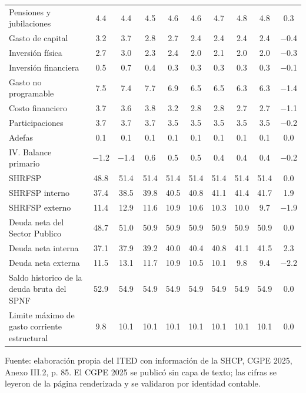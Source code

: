 \begin{longtable}{L{3.7cm}ccccccccc}
{Pensiones y jubilaciones} & \num{4.4} & \num{4.4} & \num{4.5} & \num{4.6} & \num{4.6} & \num{4.7} & \num{4.8} & \num{4.8} & \num{0.3} \\
{Gasto de capital} & \num{3.2} & \num{3.7} & \num{2.8} & \num{2.7} & \num{2.4} & \num{2.4} & \num{2.4} & \num{2.4} & \num{-0.4} \\
{Inversión física} & \num{2.7} & \num{3.0} & \num{2.3} & \num{2.4} & \num{2.0} & \num{2.1} & \num{2.0} & \num{2.0} & \num{-0.3} \\
{Inversión financiera} & \num{0.5} & \num{0.7} & \num{0.4} & \num{0.3} & \num{0.3} & \num{0.3} & \num{0.3} & \num{0.3} & \num{-0.1} \\
{Gasto no programable} & \num{7.5} & \num{7.4} & \num{7.7} & \num{6.9} & \num{6.5} & \num{6.5} & \num{6.3} & \num{6.3} & \num{-1.4} \\
{Costo financiero} & \num{3.7} & \num{3.6} & \num{3.8} & \num{3.2} & \num{2.8} & \num{2.8} & \num{2.7} & \num{2.7} & \num{-1.1} \\
{Participaciones} & \num{3.7} & \num{3.7} & \num{3.7} & \num{3.5} & \num{3.5} & \num{3.5} & \num{3.5} & \num{3.5} & \num{-0.2} \\
{Adefas} & \num{0.1} & \num{0.1} & \num{0.1} & \num{0.1} & \num{0.1} & \num{0.1} & \num{0.1} & \num{0.1} & \num{0.0} \\
{IV. Balance primario} & \num{-1.2} & \num{-1.4} & \num{0.6} & \num{0.5} & \num{0.5} & \num{0.4} & \num{0.4} & \num{0.4} & \num{-0.2} \\
{SHRFSP} & \num{48.8} & \num{51.4} & \num{51.4} & \num{51.4} & \num{51.4} & \num{51.4} & \num{51.4} & \num{51.4} & \num{0.0} \\
{SHRFSP interno} & \num{37.4} & \num{38.5} & \num{39.8} & \num{40.5} & \num{40.8} & \num{41.1} & \num{41.4} & \num{41.7} & \num{1.9} \\
{SHRFSP externo} & \num{11.4} & \num{12.9} & \num{11.6} & \num{10.9} & \num{10.6} & \num{10.3} & \num{10.0} & \num{9.7} & \num{-1.9} \\
{Deuda neta del Sector Publico} & \num{48.7} & \num{51.0} & \num{50.9} & \num{50.9} & \num{50.9} & \num{50.9} & \num{50.9} & \num{50.9} & \num{0.0} \\
{Deuda neta interna} & \num{37.1} & \num{37.9} & \num{39.2} & \num{40.0} & \num{40.4} & \num{40.8} & \num{41.1} & \num{41.5} & \num{2.3} \\
{Deuda neta externa} & \num{11.5} & \num{13.1} & \num{11.7} & \num{10.9} & \num{10.5} & \num{10.1} & \num{9.8} & \num{9.4} & \num{-2.2} \\
{Saldo historico de la deuda bruta del SPNF} & \num{52.9} & \num{54.9} & \num{54.9} & \num{54.9} & \num{54.9} & \num{54.9} & \num{54.9} & \num{54.9} & \num{0.0} \\
{Limite máximo de gasto corriente estructural} & \num{9.8} & \num{10.1} & \num{10.1} & \num{10.1} & \num{10.1} & \num{10.1} & \num{10.1} & \num{10.1} & \num{0.0} \\
\end{longtable}
\par\vspace{2pt}\footnotesize Fuente: elaboración propia del ITED con información de la SHCP, CGPE 2025, Anexo III.2, p. 85. El CGPE 2025 se publicó sin capa de texto; las cifras se leyeron de la página renderizada y se validaron por identidad contable.
\normalsize
